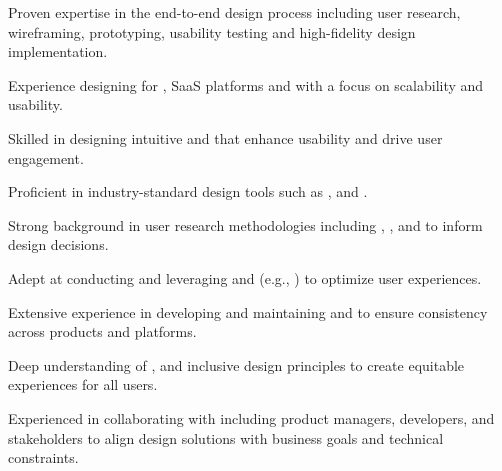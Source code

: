 

\begin{highlightentries}

    \begin{highlightitems}
        \item {Proven expertise in the end-to-end design process including user research, wireframing, prototyping, usability testing and high-fidelity design implementation.}
        \item {Experience designing for , SaaS platforms and  with a focus on scalability and usability.}
        \item {Skilled in designing intuitive  and  that enhance usability and drive user engagement.}
        \item {Proficient in industry-standard design tools such as ,  and .}
        \item {Strong background in user research methodologies including , ,  and  to inform design decisions.}
        \item {Adept at conducting  and leveraging  and  (e.g., ) to optimize user experiences.}
        \item {Extensive experience in developing and maintaining  and  to ensure consistency across products and platforms.}
        \item {Deep understanding of ,  and inclusive design principles to create equitable experiences for all users.}
        \item {Experienced in collaborating with  including product managers, developers, and stakeholders to align design solutions with business goals and technical constraints.}

\end{highlightitems}
\end{highlightentries}
